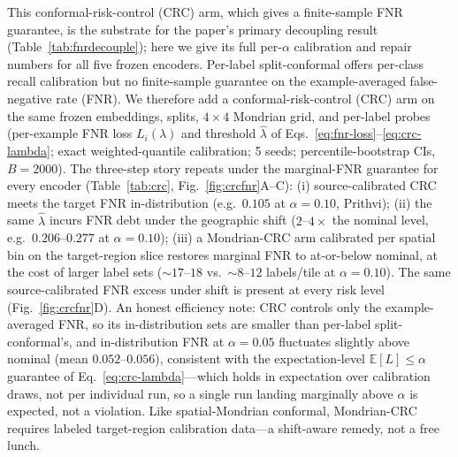 \documentclass[preprint,11pt,authoryear]{elsarticle}
\begin{document}
This conformal-risk-control (CRC) arm, which gives a finite-sample FNR guarantee, is the substrate for the
paper's primary decoupling result (Table~\ref{tab:fnrdecouple}); here we give its full per-$\alpha$
calibration and repair numbers for all five frozen encoders. Per-label split-conformal offers per-class
recall calibration but no finite-sample guarantee on the example-averaged false-negative rate (FNR). We
therefore add a conformal-risk-control (CRC) arm \citep{angelopoulos2024crc} on the same frozen embeddings, splits,
$4\times4$ Mondrian grid, and per-label probes (per-example FNR loss $L_i(\lambda)$ and threshold
$\widehat{\lambda}$ of Eqs.~\eqref{eq:fnr-loss}--\eqref{eq:crc-lambda}; exact weighted-quantile calibration;
5 seeds; percentile-bootstrap CIs, $B{=}2000$). The three-step story
repeats under the marginal-FNR guarantee for every encoder (Table~\ref{tab:crc}, Fig.~\ref{fig:crcfnr}A--C): (i) source-calibrated CRC meets the
target FNR in-distribution (e.g.\ $0.105$ at $\alpha{=}0.10$, Prithvi); (ii) the same $\widehat{\lambda}$ incurs
FNR debt under the geographic shift ($2$--$4\times$ the nominal level, e.g.\ $0.206$--$0.277$ at
$\alpha{=}0.10$); (iii) a Mondrian-CRC arm calibrated per spatial bin on the target-region slice restores
marginal FNR to at-or-below nominal, at the cost of larger label sets (${\sim}17$--$18$ vs.\
${\sim}8$--$12$ labels/tile at $\alpha{=}0.10$). The same source-calibrated FNR excess under shift is present at every risk level (Fig.~\ref{fig:crcfnr}D). An honest efficiency note: CRC controls only the
example-averaged FNR, so its in-distribution sets are smaller than per-label split-conformal's, and
in-distribution FNR at $\alpha{=}0.05$ fluctuates slightly above nominal (mean $0.052$--$0.056$), consistent
with the expectation-level $\mathbb{E}[L]\le\alpha$ guarantee of Eq.~\eqref{eq:crc-lambda}---which holds in expectation over calibration
draws, not per individual run, so a single run landing marginally above $\alpha$ is expected, not a violation. Like spatial-Mondrian conformal, Mondrian-CRC
requires labeled target-region calibration data---a shift-aware remedy, not a free lunch.
\end{document}
